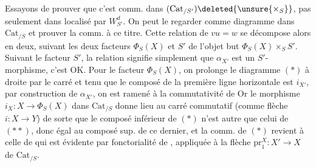 Essayons de prouver que c'est comm. dans $(\mathrm{Cat}_{/S'})\deleted{\unsure{\times_S}}$, pas seulement dans  localisé par $W_{S'}^d$. On peut le regarder comme diagramme dans $\mathrm{Cat}_{/S}$ et prouver la comm. à ce titre. Cette relation de  $vu=w$ se décompose alors en deux, suivant les deux facteurs $\Phi_S(X)$ et $S'$ de l'objet but $\Phi_S(X)\times_S S'$. Suivant le facteur $S'$, la relation signifie simplement que $\alpha_{X'}$ est un $S'$-morphisme, c'est OK. Pour le facteur $\Phi_S(X)$, on  prolonge le diagramme $(*)$ à droite par le carré
et  tenu que le composé de la première ligne horizontale est $i_{X'}$, par construction de $\alpha_{X'}$, on est ramené à la commutativité de
Or le morphisme $i_X:X\longrightarrow\Phi_S(X)$ dans $\mathrm{Cat}_{/S}$ donne lieu au carré commutatif (comme  flèche $i:X\longrightarrow Y$)
de sorte que le composé inférieur de $(*)$ n'est autre que celui de $(**)$, donc égal au composé sup. de ce dernier, et la comm. de $(*)$ revient à celle de
qui est évidente par fonctorialité de , appliquée à la flèche $\mathrm{pr}_1^X:X'\longrightarrow X$ de $\mathrm{Cat}_{/S}$.

